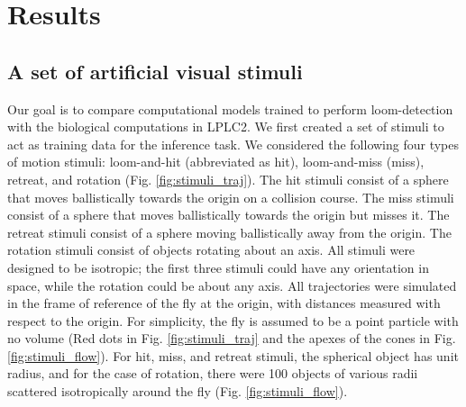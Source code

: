 \documentclass[pdftex,9pt,lineno]{elife}
\begin{document}
\section{Results}

\subsection{A set of artificial visual stimuli}





Our goal is to compare computational models trained to perform loom-detection with the biological computations in LPLC2. We first created a set of stimuli to act as training data for the inference task. We considered the following four types of motion stimuli: loom-and-hit (abbreviated as hit), loom-and-miss (miss), retreat, and rotation (Fig. \ref{fig:stimuli_traj}). The hit stimuli consist of a sphere that moves ballistically towards the origin on a collision course. The miss stimuli consist of a sphere that moves ballistically towards the origin but misses it. The retreat stimuli consist of a sphere moving ballistically away from the origin. The rotation stimuli consist of objects rotating about an axis. All stimuli were designed to be isotropic; the first three stimuli could have any orientation in space, while the rotation could be about any axis. All trajectories were simulated in the frame of reference of the fly at the origin, with distances measured with respect to the origin. For simplicity, the fly is assumed to be a point particle with no volume (Red dots in Fig. \ref{fig:stimuli_traj} and the apexes of the cones in Fig. \ref{fig:stimuli_flow}). For hit, miss, and retreat stimuli, the spherical object has unit radius, and for the case of rotation, there were 100 objects of various radii scattered isotropically around the fly (Fig. \ref{fig:stimuli_flow}).

\end{document}
